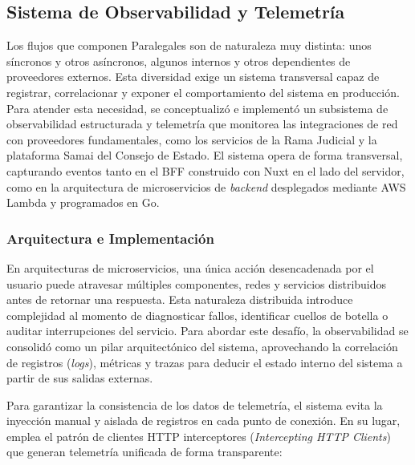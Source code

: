 \subsection{Sistema de Observabilidad y Telemetría}\label{subsec:observabilidad}

Los flujos que componen Paralegales son de naturaleza muy distinta: unos síncronos y otros asíncronos, algunos internos y otros dependientes de proveedores externos. Esta diversidad exige un sistema transversal capaz de registrar, correlacionar y exponer el comportamiento del sistema en producción. Para atender esta necesidad, se conceptualizó e implementó un subsistema de observabilidad estructurada y telemetría que monitorea las integraciones de red con proveedores fundamentales, como los servicios de la Rama Judicial y la plataforma Samai del Consejo de Estado. El sistema opera de forma transversal, capturando eventos tanto en el BFF construido con Nuxt en el lado del servidor, como en la arquitectura de microservicios de \textit{backend} desplegados mediante AWS Lambda y programados en Go.

\subsubsection{Arquitectura e Implementación}

En arquitecturas de microservicios, una única acción desencadenada por el usuario puede atravesar múltiples componentes, redes y servicios distribuidos antes de retornar una respuesta. Esta naturaleza distribuida introduce complejidad al momento de diagnosticar fallos, identificar cuellos de botella o auditar interrupciones del servicio. Para abordar este desafío, la observabilidad se consolidó como un pilar arquitectónico del sistema, aprovechando la correlación de registros (\textit{logs}), métricas y trazas para deducir el estado interno del sistema a partir de sus salidas externas.

Para garantizar la consistencia de los datos de telemetría, el sistema evita la inyección manual y aislada de registros en cada punto de conexión. En su lugar, emplea el patrón de clientes HTTP interceptores (\textit{Intercepting HTTP Clients}) que generan telemetría unificada de forma transparente:


